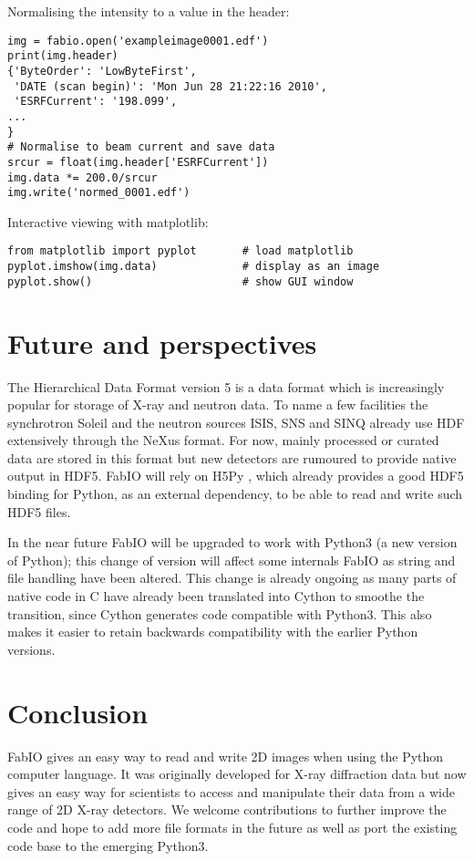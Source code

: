\documentclass[preprint]{iucr}
\begin{document}
Normalising the intensity to a value in the header:\\
\begin{verbatim}
img = fabio.open('exampleimage0001.edf')
print(img.header)
{'ByteOrder': 'LowByteFirst',
 'DATE (scan begin)': 'Mon Jun 28 21:22:16 2010',
 'ESRFCurrent': '198.099',
...
}
# Normalise to beam current and save data
srcur = float(img.header['ESRFCurrent'])
img.data *= 200.0/srcur
img.write('normed_0001.edf')
\end{verbatim}

Interactive viewing with matplotlib:\\
\begin{verbatim}
from matplotlib import pyplot       # load matplotlib 
pyplot.imshow(img.data)             # display as an image
pyplot.show()                       # show GUI window
\end{verbatim}


\section{Future and perspectives}

The Hierarchical Data Format version 5 \cite{hdf5} is a data format which is
increasingly popular for storage of X-ray and neutron data. To name a few
facilities the synchrotron Soleil \cite{tub05} and the neutron sources
ISIS, SNS and SINQ already use HDF extensively through the NeXus \cite{nexus}
format.
For now, mainly processed or curated data are stored in this format but new detectors are
rumoured to provide native output in HDF5.
FabIO will rely on H5Py \cite{h5py}, which already
provides a good HDF5 binding for Python, as an external dependency, to be able
to read and write such HDF5 files.

In the near future FabIO will be upgraded to work with Python3 (a new version of 
Python); this change of version will affect some internals FabIO as string and 
file handling have been altered.
This change is already ongoing as many parts of native code in C have already
been translated into Cython \cite{cython} to smoothe the transition, since 
Cython generates code compatible with Python3. 
This also makes it easier to retain backwards compatibility with the earlier
Python versions. 

\section{Conclusion}

FabIO gives an easy way to read and write 2D images when using the
Python computer language.
It was originally developed for X-ray diffraction data but now gives
an easy way for scientists to access and manipulate
their data from a wide range of 2D X-ray detectors.
We welcome contributions to further improve the code and hope to add
more file formats in the future as well as port the existing code base 
to the emerging Python3.
\end{document}
